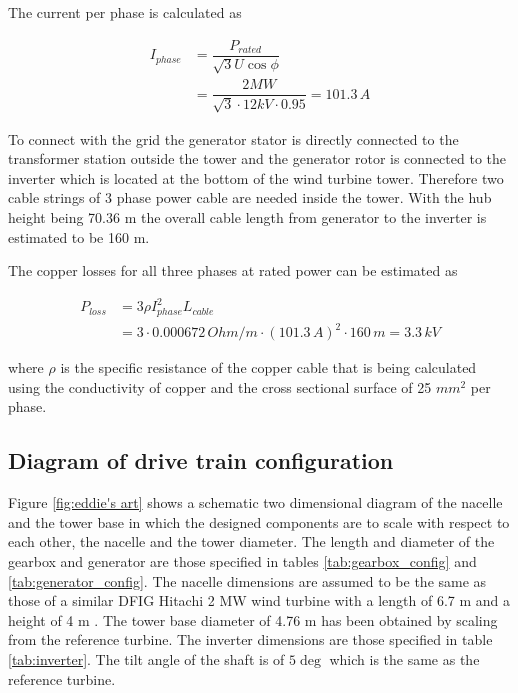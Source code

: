 The current per phase is calculated as

\begin{align}
    I_{phase} &= \dfrac{P_{rated}}{\sqrt{3}U \cos \phi} \\
    &= \dfrac{2 MW}{\sqrt{3} \cdot 12 kV \cdot 0.95} = 101.3\,A \nonumber
\end{align}

To connect with the grid the generator stator is directly connected to the transformer station outside the tower and the generator rotor is connected to the inverter which is located at the bottom of the wind turbine tower. Therefore two cable strings of 3 phase power cable are needed inside the tower. With the hub height being 70.36 m the overall cable length from generator to the inverter is estimated to be 160 m. 

The copper losses for all three phases at rated power can be estimated as

\begin{align}
    P_{loss} &= 3 \rho I_{phase}^2 L_{cable} \\
    &= 3 \cdot 0.000672\,Ohm/m \cdot \left(101.3\,A\right)^2 \cdot 160\,m = 3.3\,kV \nonumber
\end{align}

where $\rho$ is the specific resistance of the copper cable that is being calculated using the conductivity of copper and the cross sectional surface of 25 $mm^2$ per phase. 

\subsection{Diagram of drive train configuration}

Figure \ref{fig:eddie's art} shows a schematic two dimensional diagram of the nacelle and the tower base in which the designed components are to scale with respect to each other, the nacelle and the tower diameter. The length and diameter of the gearbox and generator are those specified in tables \ref{tab:gearbox_config} and \ref{tab:generator_config}. The nacelle dimensions are assumed to be the same as those of a similar DFIG Hitachi 2 MW wind turbine with a length of 6.7 m and a height of 4 m \cite{hitachi}. The tower base diameter of 4.76 m has been obtained by scaling from the reference turbine. The inverter dimensions are those specified in table \ref{tab:inverter}. The tilt angle of the shaft is of $5\deg$ which is the same as the reference turbine.


